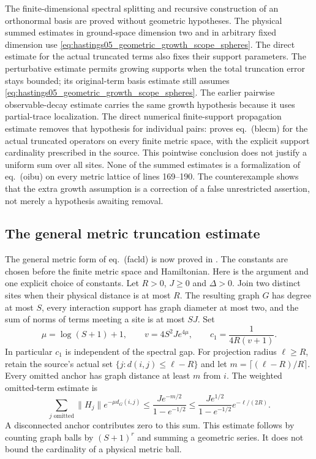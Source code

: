 \documentclass{article}
\begin{document}
The finite-dimensional spectral splitting and recursive construction of an
orthonormal basis are proved without geometric hypotheses. The physical
summed estimates in ground-space dimension two and in arbitrary fixed
dimension use \eqref{eq:hastings05_geometric_growth_scope_spheres}. The
direct estimate for the actual truncated terms also fixes their support
parameters. The perturbative estimate permits growing supports when the
total truncation error stays bounded; its original-term basis estimate
still assumes \eqref{eq:hastings05_geometric_growth_scope_spheres}.
The earlier pairwise observable-decay estimate carries the same growth
hypothesis because it uses partial-trace localization. The direct numerical
finite-support propagation estimate removes that hypothesis for individual
pairs:  proves eq.~(blecm) for the
actual truncated operators on every finite metric space, with the explicit
support cardinality prescribed in the source. This pointwise conclusion
does not justify a uniform sum over all sites. None of the summed estimates
is a formalization of eq.~(oibu) on every metric lattice of lines 169--190. The counterexample
shows that the extra growth assumption is a correction of a false
unrestricted assertion, not merely a hypothesis awaiting removal.

\subsection{The general metric truncation estimate}

The general metric form of eq.~(facld) is now proved in
. The constants are chosen before
the finite metric space and Hamiltonian. Here is the argument and one explicit
choice of constants. Let $R>0$, $J\ge0$ and $\Delta>0$. Join two distinct sites
when their physical distance is at most $R$. The resulting graph $G$ has degree
at most $S$, every interaction support has graph diameter at most two, and the
sum of norms of terms meeting a site is at most $SJ$. Set
\[
 \mu=\log(S+1)+1,\qquad
 v=4S^2J e^{4\mu},\qquad
 c_1=\frac{1}{4R(v+1)}.
\]
In particular $c_1$ is independent of the spectral gap. For projection radius
$\ell\ge R$, retain the source's actual set
$\{j:d(i,j)\le\ell-R\}$ and let $m=\lceil(\ell-R)/R\rceil$.
Every omitted anchor has graph distance at least $m$ from $i$.
The weighted omitted-term estimate is
\[
 \sum_{j\text{ omitted}}\|H_j\|e^{-\mu d_G(i,j)}
 \le \frac{J e^{-m/2}}{1-e^{-1/2}}
 \le \frac{J e^{1/2}}{1-e^{-1/2}}e^{-\ell/(2R)}.
\]
A disconnected anchor contributes zero to this sum. This estimate follows by
counting graph balls by $(S+1)^r$ and summing a geometric series. It does not
bound the cardinality of a physical metric ball.
\end{document}

